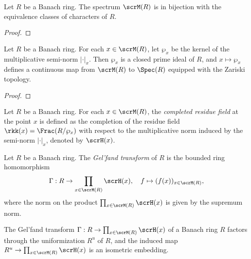     \begin{proposition}\label{prop:spectrum_of_banach_rings_and_equivalence_class_of_characters}
        Let \(R\) be a Banach ring.
        The spectrum \(\scrM(R)\) is in bijection with the equivalence classes of characters of \(R\).
    \end{proposition}
    \begin{proof}
    \end{proof}

    \begin{proposition}\label{prop:map_from_M_R_to_Spec_R}
        Let \(R\) be a Banach ring.
        For each \(x \in \scrM(R)\), let \(\wp_x\) be the kernel of the multiplicative semi-norm \(|\cdot|_x\).
        Then \(\wp_x\) is a closed prime ideal of \(R\), and \(x \mapsto \wp_x\) defines a continuous map from \(\scrM(R)\) to \(\Spec(R)\) equipped with the Zariski topology.
    \end{proposition}
    \begin{proof}
    \end{proof}

    \begin{definition}
        Let \(R\) be a Banach ring.
        For each \(x \in \scrM(R)\), the \emph{completed residue field} at the point \(x\) is defined as the completion of the residue field \(\rkk(x) = \Frac(R/\wp_x)\) with respect to the multiplicative norm induced by the semi-norm \(|\cdot|_x\), denoted by \(\scrH(x)\).
    \end{definition}

    \begin{definition}\label{def:Gelfand_transform_of_banach_rings}
        Let \(R\) be a Banach ring.
        The \emph{Gel'fand transform} of \(R\) is the bounded ring homomorphism
        \[
            \Gamma: R \to \prod_{x \in \scrM(R)} \scrH(x), \quad f \mapsto (f(x))_{x \in \scrM(R)},
        \]
        where the norm on the product \(\prod_{x \in \scrM(R)} \scrH(x)\) is given by the supremum norm.
    \end{definition}

    \begin{proposition}\label{prop:Gelfand_transform_and_the_uniformization_of_a_banach_ring}
        The Gel'fand transform \(\Gamma: R \to \prod_{x \in \scrM(R)} \scrH(x)\) of a Banach ring \(R\) factors through the uniformization \(R^u\) of \(R\), and the induced map \(R^u \to \prod_{x \in \scrM(R)} \scrH(x)\) is an isometric embedding.
    \end{proposition}

